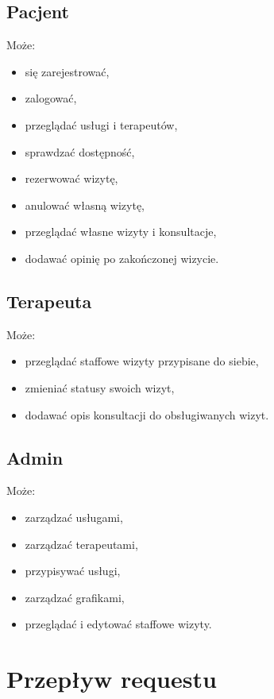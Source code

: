 \documentclass[11pt,a4paper]{article}
\begin{document}
\subsection{Pacjent}
Może:
\begin{itemize}[leftmargin=1.2cm]
    \item się zarejestrować,
    \item zalogować,
    \item przeglądać usługi i terapeutów,
    \item sprawdzać dostępność,
    \item rezerwować wizytę,
    \item anulować własną wizytę,
    \item przeglądać własne wizyty i konsultacje,
    \item dodawać opinię po zakończonej wizycie.
\end{itemize}

\subsection{Terapeuta}
Może:
\begin{itemize}[leftmargin=1.2cm]
    \item przeglądać staffowe wizyty przypisane do siebie,
    \item zmieniać statusy swoich wizyt,
    \item dodawać opis konsultacji do obsługiwanych wizyt.
\end{itemize}

\subsection{Admin}
Może:
\begin{itemize}[leftmargin=1.2cm]
    \item zarządzać usługami,
    \item zarządzać terapeutami,
    \item przypisywać usługi,
    \item zarządzać grafikami,
    \item przeglądać i edytować staffowe wizyty.
\end{itemize}

\section{Przepływ requestu}
\end{document}

